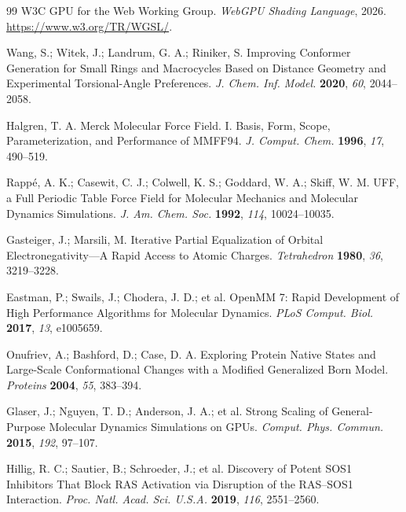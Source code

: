 \documentclass[11pt]{article}
\begin{document}
\begin{thebibliography}{99}
W3C GPU for the Web Working Group.
\emph{WebGPU Shading Language}, 2026. \url{https://www.w3.org/TR/WGSL/}.

Wang, S.; Witek, J.; Landrum, G. A.; Riniker, S.
Improving Conformer Generation for Small Rings and Macrocycles Based on Distance Geometry and Experimental Torsional-Angle Preferences.
\emph{J. Chem. Inf. Model.} \textbf{2020}, \emph{60}, 2044--2058.

Halgren, T. A.
Merck Molecular Force Field. I. Basis, Form, Scope, Parameterization, and Performance of MMFF94.
\emph{J. Comput. Chem.} \textbf{1996}, \emph{17}, 490--519.

Rapp\'{e}, A. K.; Casewit, C. J.; Colwell, K. S.; Goddard, W. A.; Skiff, W. M.
UFF, a Full Periodic Table Force Field for Molecular Mechanics and Molecular Dynamics Simulations.
\emph{J. Am. Chem. Soc.} \textbf{1992}, \emph{114}, 10024--10035.

Gasteiger, J.; Marsili, M.
Iterative Partial Equalization of Orbital Electronegativity---A Rapid Access to Atomic Charges.
\emph{Tetrahedron} \textbf{1980}, \emph{36}, 3219--3228.

Eastman, P.; Swails, J.; Chodera, J. D.; et al.
OpenMM 7: Rapid Development of High Performance Algorithms for Molecular Dynamics.
\emph{PLoS Comput. Biol.} \textbf{2017}, \emph{13}, e1005659.

Onufriev, A.; Bashford, D.; Case, D. A.
Exploring Protein Native States and Large-Scale Conformational Changes with a Modified Generalized Born Model.
\emph{Proteins} \textbf{2004}, \emph{55}, 383--394.

Glaser, J.; Nguyen, T. D.; Anderson, J. A.; et al.
Strong Scaling of General-Purpose Molecular Dynamics Simulations on GPUs.
\emph{Comput. Phys. Commun.} \textbf{2015}, \emph{192}, 97--107.

Hillig, R. C.; Sautier, B.; Schroeder, J.; et al.
Discovery of Potent SOS1 Inhibitors That Block RAS Activation via Disruption of the RAS--SOS1 Interaction.
\emph{Proc. Natl. Acad. Sci. U.S.A.} \textbf{2019}, \emph{116}, 2551--2560.

\end{thebibliography}
\end{document}
